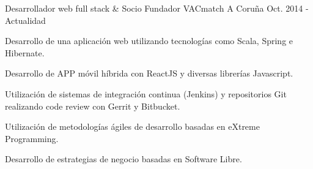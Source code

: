 


\begin{cventries}


\cventry
{Desarrollador web full stack \& Socio Fundador} %
{VACmatch} %
{A Coruña} %
{Oct. 2014 - Actualidad} %
{ %
\begin{cvitems}
\item {Desarrollo de una aplicación web utilizando tecnologías como Scala, Spring e Hibernate.}
\item {Desarrollo de APP móvil híbrida con ReactJS y diversas librerías Javascript.}
\item {Utilización de sistemas de integración continua (Jenkins) y repositorios Git realizando code review  con Gerrit y Bitbucket.}
\item {Utilización de metodologías ágiles de desarrollo basadas en eXtreme Programming.}
\item {Desarrollo de estrategias de negocio basadas en Software Libre.}
\end{cvitems}
}


\end{cventries}